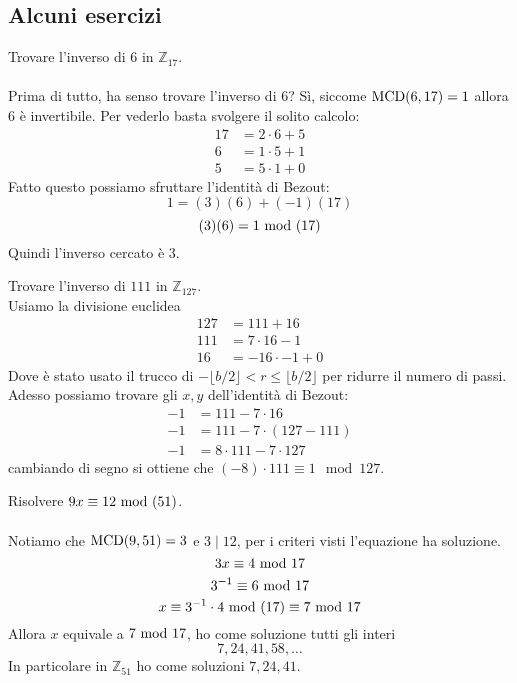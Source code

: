 \subsection{Alcuni esercizi}
\begin{esercizio}
	Trovare l'inverso di 6 in $\mathbb{Z}_{17}$. \\ \\
	Prima di tutto, ha senso trovare l'inverso di 6? Sì, siccome $\operatorname{\mathrm{MCD}}(6,17)=1$ allora 6 è invertibile. Per vederlo basta svolgere il solito calcolo:
	\begin{align*}
	17&=2\cdot6+5\\
	6&=1\cdot5+1\\
	5&=5\cdot1+0
	\end{align*}
	Fatto questo possiamo sfruttare l'identità di Bezout:
	\begin{equation*}
	1=(3)(6)+(-1)(17)
	\end{equation*}
	\begin{equation*}
	(3)(6)=1\ \mathrm{mod}\ (17)
	\end{equation*}
	Quindi l'inverso cercato è 3.
\end{esercizio}
\begin{esercizio}
	Trovare l'inverso di $111$ in $\mathbb{Z}_{127}$. \\
	
	Usiamo la divisione euclidea
	\begin{align*}
		127  &= 111 + 16 \\
		111  &= 7 \cdot 16 - 1 \\
		16   &= -16\cdot -1 + 0
	\end{align*}	
    Dove è stato usato il trucco di $-\lfloor b/2\rfloor < r \le\lfloor{b/2}\rfloor$ per ridurre il numero di passi. Adesso possiamo trovare gli $x,y$ dell'identità di Bezout:
    \begin{align*}
    	-1 &= 111 - 7 \cdot 16 \\
    	-1 &= 111 - 7 \cdot (127 - 111) \\
    	-1 &= 8 \cdot 111 - 7 \cdot 127 
    \end{align*}
	cambiando di segno si ottiene che $(-8) \cdot 111\equiv 1 \mod 127$.
\end{esercizio}
\begin{esercizio}
	Risolvere $9x\equiv12\ \mathrm{mod}\ (51)$.\\ \\
	Notiamo che $\operatorname{\mathrm{MCD}}(9,51)=3$ e $3\mid12$, per i criteri visti l'equazione ha soluzione. 
	\begin{equation*}
	3x\equiv4\ \mathrm{mod}\ 17
	\end{equation*}
	\begin{equation*}
	3^{-1}\equiv6\ \mathrm{mod}\ 17
	\end{equation*}
	\begin{equation*}
	x\equiv3^{-1}\cdot4\ \mathrm{mod}\ (17)\equiv7\ \mathrm{mod}\ 17
	\end{equation*}
	Allora $x$ equivale a $7\ \mathrm{mod}\ 17$, ho come soluzione tutti gli interi
	\begin{equation*}
	7,24,41,58,\dots
	\end{equation*}
	In particolare in $\mathbb{Z}_{51}$ ho come soluzioni $7,24,41$.
\end{esercizio}
